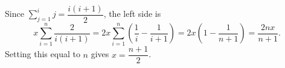 Since $\sum_{j=1}^i j=\dfrac{i(i+1)}2$, the left side is
\[x\sum_{i=1}^n\dfrac{2}{i(i+1)}=2x\sum_{i=1}^n\left(\dfrac1i-\dfrac1{i+1}\right)=2x\left(1-\dfrac1{n+1}\right)=\dfrac{2nx}{n+1}.\]
Setting this equal to $n$ gives $x=\boxed{\dfrac{n+1}{2}}$.
